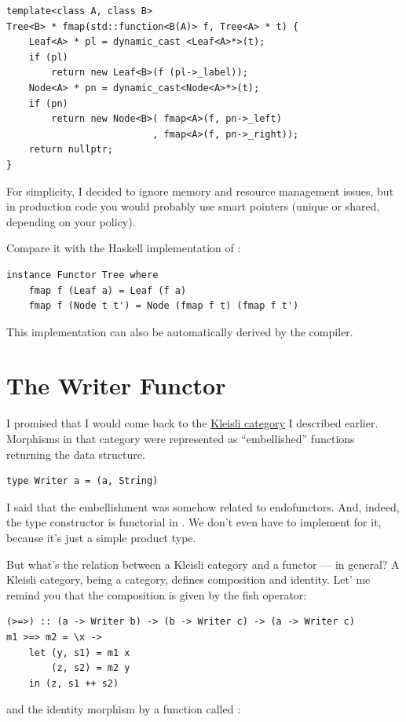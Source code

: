 \begin{verbatim}
template<class A, class B>
Tree<B> * fmap(std::function<B(A)> f, Tree<A> * t) {
    Leaf<A> * pl = dynamic_cast <Leaf<A>*>(t);
    if (pl)
        return new Leaf<B>(f (pl->_label));
    Node<A> * pn = dynamic_cast<Node<A>*>(t);
    if (pn)
        return new Node<B>( fmap<A>(f, pn->_left) 
                          , fmap<A>(f, pn->_right));
    return nullptr;
}
\end{verbatim}
For simplicity, I decided to ignore memory and resource management
issues, but in production code you would probably use smart pointers
(unique or shared, depending on your policy).

Compare it with the Haskell implementation of :

\begin{verbatim}
instance Functor Tree where
    fmap f (Leaf a) = Leaf (f a)
    fmap f (Node t t') = Node (fmap f t) (fmap f t')
\end{verbatim}
This implementation can also be automatically derived by the compiler.

\section{The Writer Functor}\label{the-writer-functor}

I promised that I would come back to the \hyperref[kleisli-categories-page]{Kleisli
category} I described earlier. Morphisms in that category were
represented as ``embellished'' functions returning the 
data structure.

\begin{verbatim}
type Writer a = (a, String)
\end{verbatim}
I said that the embellishment was somehow related to endofunctors. And,
indeed, the  type constructor is functorial in
. We don't even have to implement  for it,
because it's just a simple product type.

But what's the relation between a Kleisli category and a functor --- in
general? A Kleisli category, being a category, defines composition and
identity. Let' me remind you that the composition is given by the fish
operator:

\begin{verbatim}
(>=>) :: (a -> Writer b) -> (b -> Writer c) -> (a -> Writer c)
m1 >=> m2 = \x ->
    let (y, s1) = m1 x
        (z, s2) = m2 y 
    in (z, s1 ++ s2)
\end{verbatim}
and the identity morphism by a function called :

